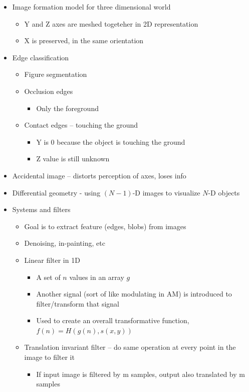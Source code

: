 \documentclass{article}
\begin{document}
\begin{itemize}
\begin{itemize}
\end{itemize}
\item Image formation model for three dimensional world 
\begin{itemize}
\item Y and Z axes are meshed togeteher in 2D representation 
\item X is preserved, in the same orientation 
\end{itemize}
\item Edge classification 
\begin{itemize}
\item Figure segmentation 
\item Occlusion edges 
\begin{itemize}
\item Only the foreground 
\end{itemize}
\item Contact edges – touching the ground 
\begin{itemize}
\item Y is 0 because the object is touching the ground 
\item Z value is still unknown 
\end{itemize}
\end{itemize}
\item Accidental image – distorts perception of axes, loses info 
\item Differential geometry - using $(N-1)$-D images to visualize $N$-D objects
\item Systems and filters
\begin{itemize}
\item Goal is to extract feature (edges, blobs) from images 
\item Denoising, in-painting, etc 
\item Linear filter in 1D 
\begin{itemize}
\item A set of $n$ values in an array $g$ 
\item Another signal (sort of like modulating in AM) is introduced to filter/transform that signal 
\item Used to create an overall transformative function,$ f(n) =H(g(n), s(x,y))$
\end{itemize}
\item Translation invariant filter – do same operation at every point in the image to filter it 
\begin{itemize}
\item If input image is filtered by m samples, output also translated by m samples 

\end{itemize}
\end{itemize}
\end{itemize}
\end{document}
